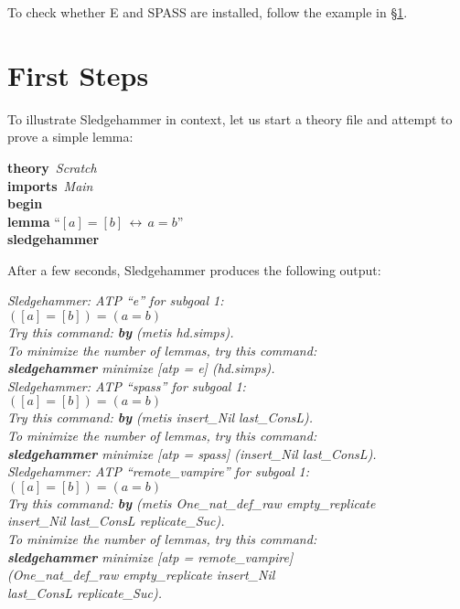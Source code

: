 \documentclass[a4paper,12pt]{article}
\begin{document}
To check whether E and SPASS are installed, follow the example in
\S\ref{first-steps}.

\section{First Steps}
\label{first-steps}

To illustrate Sledgehammer in context, let us start a theory file and
attempt to prove a simple lemma:

\prew
\textbf{theory}~\textit{Scratch} \\
\textbf{imports}~\textit{Main} \\
\textbf{begin} \\[2\smallskipamount]
%
\textbf{lemma} ``$[a] = [b] \,\longleftrightarrow\, a = b$'' \\
\textbf{sledgehammer}
\postw

After a few seconds, Sledgehammer produces the following output:

\prew
\slshape
Sledgehammer: ATP ``\textit{e}'' for subgoal 1: \\
$([a] = [b]) = (a = b)$ \\
Try this command: \textbf{by} (\textit{metis hd.simps}). \\
To minimize the number of lemmas, try this command: \\
\textbf{sledgehammer} \textit{minimize} [\textit{atp} = \textit{e}] (\textit{hd.simps}). \\[3\smallskipamount]
%
Sledgehammer: ATP ``\textit{spass}'' for subgoal 1: \\
$([a] = [b]) = (a = b)$ \\
Try this command: \textbf{by} (\textit{metis insert\_Nil last\_ConsL}). \\
To minimize the number of lemmas, try this command: \\
\textbf{sledgehammer} \textit{minimize} [\textit{atp} = \textit{spass}] (\textit{insert\_Nil last\_ConsL}). \\[3\smallskipamount]
%
Sledgehammer: ATP ``\textit{remote\_vampire}'' for subgoal 1: \\
$([a] = [b]) = (a = b)$ \\
Try this command: \textbf{by} (\textit{metis One\_nat\_def\_raw empty\_replicate} \\
\textit{insert\_Nil last\_ConsL replicate\_Suc}). \\
To minimize the number of lemmas, try this command: \\
\textbf{sledgehammer} \textit{minimize} [\textit{atp} = \textit{remote\_vampire}] \\
(\textit{One\_nat\_def\_raw empty\_replicate insert\_Nil} \\
\textit{last\_ConsL replicate\_Suc}).
\postw
\end{document}
